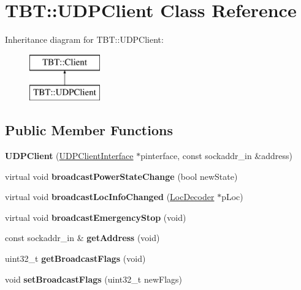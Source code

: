 \hypertarget{classTBT_1_1UDPClient}{}\section{T\+BT\+:\+:U\+D\+P\+Client Class Reference}
\label{classTBT_1_1UDPClient}
Inheritance diagram for T\+BT\+:\+:U\+D\+P\+Client\+:\begin{figure}[H]
\begin{center}
\leavevmode
\includegraphics[height=2.000000cm]{classTBT_1_1UDPClient}
\end{center}
\end{figure}
\subsection*{Public Member Functions}
\begin{DoxyCompactItemize}
\item 
\mbox{\label{classTBT_1_1UDPClient_a7b6f7858b9d3a7243bdd48fbf150b9f8}} 
{\bfseries U\+D\+P\+Client} (\hyperlink{classTBT_1_1UDPClientInterface}{U\+D\+P\+Client\+Interface} $\ast$pinterface, const sockaddr\+\_\+in \&address)
\item 
\mbox{\label{classTBT_1_1UDPClient_aafe098769858c054b025bf3b3ccacf30}} 
virtual void {\bfseries broadcast\+Power\+State\+Change} (bool new\+State)
\item 
\mbox{\label{classTBT_1_1UDPClient_a90c650259501f341f531ede72210624a}} 
virtual void {\bfseries broadcast\+Loc\+Info\+Changed} (\hyperlink{classTBT_1_1LocDecoder}{Loc\+Decoder} $\ast$p\+Loc)
\item 
\mbox{\label{classTBT_1_1UDPClient_a378d141aa807a685b1e70adaacd5fc17}} 
virtual void {\bfseries broadcast\+Emergency\+Stop} (void)
\item 
\mbox{\label{classTBT_1_1UDPClient_a8471b71655c61bf074b70b62a6dffbf1}} 
const sockaddr\+\_\+in \& {\bfseries get\+Address} (void)
\item 
\mbox{\label{classTBT_1_1UDPClient_a18da0bdc657f707f4c0af6cd3b1e6031}} 
uint32\+\_\+t {\bfseries get\+Broadcast\+Flags} (void)
\item 
\mbox{\label{classTBT_1_1UDPClient_a23a0b0ecf47f8a2fe018a570f46ecdfe}} 
void {\bfseries set\+Broadcast\+Flags} (uint32\+\_\+t new\+Flags)
\end{DoxyCompactItemize}
